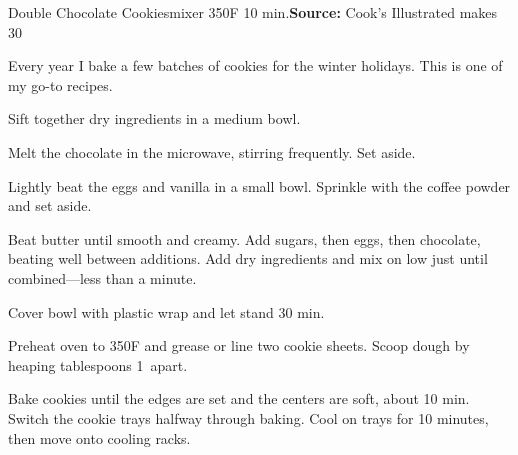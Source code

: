 \begin{recipe}{Double Chocolate Cookies}{mixer \hfill 350\0F \hfill 10 min.}{\textbf{Source:} Cook's Illustrated \hfill makes 30}

 \freeform Every year I bake a few batches of cookies for the winter holidays. This is one of my go-to recipes.

 Sift together dry ingredients in a medium bowl.

 Melt the chocolate in the microwave, stirring frequently. Set aside.

 Lightly beat the eggs and vanilla in a small bowl. Sprinkle with the coffee powder and set aside.

 Beat butter until smooth and creamy. Add sugars, then eggs, then chocolate, beating well between additions. Add dry ingredients and mix on low just until combined---less than a minute.

 \newstep Cover bowl with plastic wrap and let stand 30 min.

 \newstep Preheat oven to 350\0F and grease or line two cookie sheets. Scoop dough by heaping tablespoons 1\inch\ apart.

 \newstep Bake cookies until the edges are set and the centers are soft, about 10 min. Switch the cookie trays halfway through baking. Cool on trays for 10 minutes, then move onto cooling racks.

\end{recipe}


